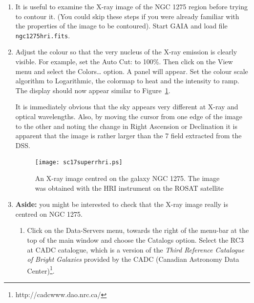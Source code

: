 \documentclass[twoside,11pt]{article}
\newcommand{\arcmin} {\raisebox{-0.5ex}{$^{'}$} }
\newcommand{\htmladdnormallinkfoot}[2]{#1\footnote{#2}}
\renewcommand{\_}{\texttt{\symbol{95}}}
\begin{document}
\begin{enumerate}

  \item It is useful to examine the X-ray image of the NGC 1275 region
   before trying to contour it.  (You could skip these steps if you
   were already familiar with the properties of the image to be contoured).
   Start GAIA and load file {\tt ngc1275hri.fits}.

  \item Adjust the colour so that the very nucleus of the X-ray emission
   is clearly visible.  For example, set the {\sf Auto Cut:} to 100\%.
   Then click on the {\sf View} menu and select the {\sf
   Colors\ldots} option.  A panel will appear.  Set the colour scale
   algorithm to {\sf Logarithmic}, the colormap to {\sf heat} and the
   intensity to {\sf ramp}.  The display should now appear similar to
   Figure~\ref{SUPER_R_HRI}.

   It is immediately obvious that the sky appears very different at X-ray
   and optical wavelengths.  Also, by moving the cursor from one edge of
   the image to the other and noting the change in Right Ascension or
   Declination it is apparent that the image is rather larger than the
   7\arcmin field extracted from the DSS.

  \begin{figure}[htbp]
     \centering 
     \texttt{[image: sc17\_super\_r\_hri.ps]}
     \begin{quote}
     \caption[An X-ray image of NGC 1275]
      {An X-ray image centred on the galaxy NGC 1275.  The image was
      obtained with the HRI instrument on the ROSAT satellite
     \label{SUPER_R_HRI} }
     \end{quote}
  \end{figure}

  \item {\bf Aside:} you might be interested to check that the X-ray
   image really is centred on NGC 1275.  

  \begin{enumerate}

    \item Click on the {\sf Data-Servers} menu, towards the right of the
     menu-bar at the top of the main window and choose the {\sf Catalogs}
     option.  Select the {\sf RC3 at CADC} catalogue, which is a version
     of the {\it Third Reference Catalogue of Bright Galaxies}\/\cite{RC3} 
     provided by the
     \htmladdnormallinkfoot{CADC (Canadian Astronomy Data Center)}
     {http://cadcwww.dao.nrc.ca/}.


\end{enumerate}
\end{enumerate}
\end{document}
